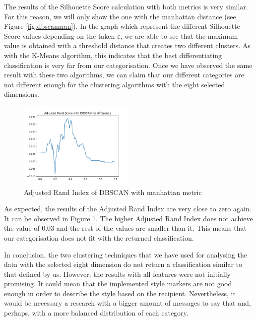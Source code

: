 The results of the Silhouette Score calculation with both metrics is very similar. For this reason, we will only show the one with the manhattan distance (see Figure \ref{fig:dbscanman}). In the graph which represent the different Silhouette Score values depending on the taken $\varepsilon$, we are able to see that the maximum value is obtained with a threshold distance that creates two different clusters. As with the K-Means algorithm, this indicates that the best differentiating classification is very far from our categorisation. Once we have observed the same result with these two algorithms, we can claim that our different categories are not different enough for the clustering algorithms with the eight selected dimensions.

\begin{figure}[h]
	\centering%
	\centerline{\includegraphics[width=0.5\textwidth]{Imagenes/Bitmap/Clustering/dbscan8ari.png}}%
	\caption{Adjusted Rand Index of DBSCAN with manhattan metric}%
	\label{fig:dbscan8ari}
\end{figure}

As expected, the results of the Adjusted Rand Index are very close to zero again. It can be observed in Figure \ref{fig:dbscan8ari}. The higher Adjusted Rand Index does not achieve the value of 0.03 and the rest of the values are smaller than it. This means that our categorisation does not fit with the returned classification.

In conclusion, the two clustering techniques that we have used for analysing the data with the selected eight dimension do not return a classification similar to that defined by us. However, the results with all features were not initially promising. It could mean that the implemented style markers are not good enough in order to describe the style based on the recipient. Nevertheless, it would be necessary a research with a bigger amount of messages to say that and, perhaps, with a more balanced distribution of each category.